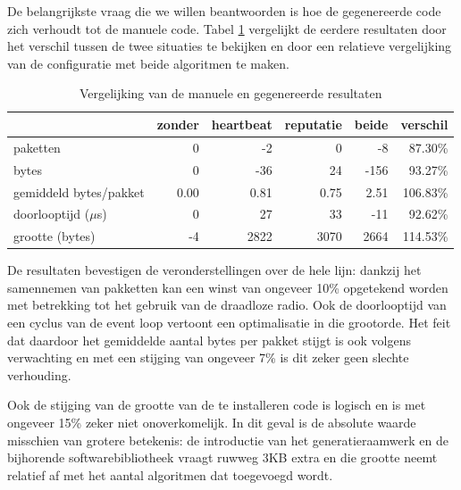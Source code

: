 De belangrijkste vraag die we willen beantwoorden is hoe de gegenereerde code
zich verhoudt tot de manuele code. Tabel \ref{tbl:comparison} vergelijkt de
eerdere resultaten door het verschil tussen de twee situaties te bekijken en
door een relatieve vergelijking van de configuratie met beide algoritmen te
maken.

\begin{table}[H]
  \centering
  \begin{tabular}{l|r|rrrr}
  \hline
  & zonder & heartbeat & reputatie & beide & verschil\\
  \hline
  \hline

paketten               &  0    &   -2    &    0    &   -8    & \cellcolor{green!25} 87.30\% \\
bytes                  &  0    &  -36    &   24    & -156    & \cellcolor{green!25} 93.27\% \\
gemiddeld bytes/pakket &  0.00 &    0.81 &    0.75 &    2.51 & \cellcolor{red!25}  106.83\% \\
doorlooptijd ($\mu$s)  &  0    &   27    &   33    &  -11    & \cellcolor{green!25} 92.62\% \\
grootte (bytes)        & -4    & 2822    & 3070    & 2664    & \cellcolor{red!25}  114.53\% \\

  \hline
  \end{tabular}
  \caption{Vergelijking van de manuele en gegenereerde resultaten}
  \label{tbl:comparison}
\end{table}

De resultaten bevestigen de veronderstellingen over de hele lijn: dankzij het
samennemen van pakketten kan een winst van ongeveer 10\% opgetekend worden met
betrekking tot het gebruik van de draadloze radio. Ook de doorlooptijd van een
cyclus van de event loop vertoont een optimalisatie in die grootorde. Het feit
dat daardoor het gemiddelde aantal bytes per pakket stijgt is ook volgens
verwachting en met een stijging van ongeveer 7\% is dit zeker geen slechte
verhouding.

Ook de stijging van de grootte van de te installeren code is logisch en is met
ongeveer 15\% zeker niet onoverkomelijk. In dit geval is de absolute waarde
misschien van grotere betekenis: de introductie van het generatieraamwerk en de
bijhorende softwarebibliotheek vraagt ruwweg 3KB extra en die grootte neemt
relatief af met het aantal algoritmen dat toegevoegd wordt.

\vspace{-3mm}

